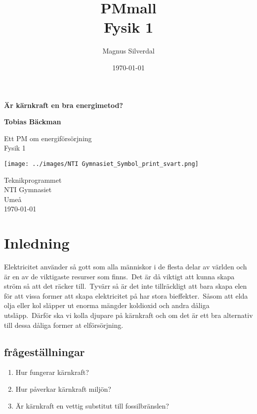 \documentclass[11p]{article}
\title{PMmall \\ \small Fysik 1}
\author{Magnus Silverdal }
\date{\today}
\begin{document}
    \begin{titlepage}
        \begin{center}
            \vspace*{1cm}

            \Huge
            \textbf{Är kärnkraft en bra energimetod?}

            \vspace{0.5cm}

            \vspace{1.5cm}

            \textbf{Tobias Bäckman}

            \vfill

            Ett PM om energiförsörjning \\
            Fysik 1

            \vspace{0.8cm}

            \texttt{[image: ../images/NTI Gymnasiet\_Symbol\_print\_svart.png]}

            \Large
            Teknikprogrammet\\
            NTI Gymnasiet\\
            Umeå\\
            \today

        \end{center}
    \end{titlepage}
    \tableofcontents
    \newpage

    \section{Inledning}
    Elektricitet använder så gott som alla människor i de flesta delar av världen och är en av de viktigaste
    resurser som finns.\ Det är då viktigt att kunna skapa ström så att det räcker till.\ Tyvärr så är det
    inte tillräckligt att bara skapa elen för att vissa former att skapa elektricitet på har stora bieffekter.\ 
    Såsom att elda olja eller kol släpper ut enorma mängder koldioxid och andra dåliga utsläpp.\ 
    Därför ska vi kolla djupare på kärnkraft och om det är ett bra alternativ till dessa dåliga former at elförsörjning. 
    \subsection{frågeställningar}
    \begin{enumerate}
        \item Hur fungerar kärnkraft?
        \item Hur påverkar kärnkraft miljön?
        \item Är kärnkraft en vettig substitut till fossilbränslen?
    \end{enumerate}
\end{document}
